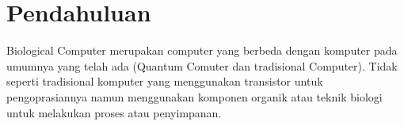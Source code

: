 \chapter{Pendahuluan}
Biological Computer merupakan computer yang berbeda dengan komputer pada umumnya yang telah ada (Quantum Comuter dan tradisional Computer). Tidak seperti tradisional komputer yang menggunakan transistor untuk pengoprasiannya namun menggunakan komponen organik atau teknik biologi untuk melakukan proses atau penyimpanan.